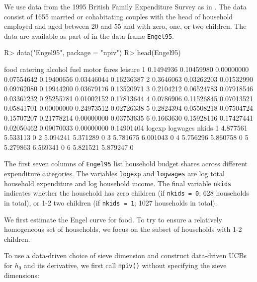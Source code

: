 \documentclass[
]{jss}
\begin{document}
We use data from the 1995 British Family Expenditure Survey as in
\citet{BCK}. The data consist of 1655 married or cohabitating couples
with the head of household employed and aged between 20 and 55 and with
zero, one, or two children. The data are available as part of 
in the data frame \texttt{Engel95}.

\begin{CodeChunk}
\begin{CodeInput}
R> data("Engel95", package = "npiv")
R> head(Engel95)
\end{CodeInput}
\begin{CodeOutput}
       food   catering    alcohol       fuel      motor      fares    leisure
1 0.1494936 0.10459980 0.00000000 0.07554642 0.19400656 0.03446044 0.16236387
2 0.3646063 0.03262203 0.01532990 0.09762080 0.19944200 0.03679176 0.13520971
3 0.2104212 0.06524783 0.07918546 0.03367232 0.25255781 0.01002152 0.17813644
4 0.0786906 0.11526845 0.07013521 0.05841701 0.00000000 0.24973512 0.02726338
5 0.2824394 0.05508218 0.07504724 0.15707207 0.21778214 0.00000000 0.03753635
6 0.1663630 0.15928116 0.17427441 0.02050462 0.09070033 0.00000000 0.14901404
    logexp logwages nkids
1 4.877561 5.533113     0
2 5.094241 5.371289     0
3 5.781675 6.001043     0
4 5.756296 5.860758     0
5 5.279863 6.569341     0
6 5.821521 5.879247     0
\end{CodeOutput}
\end{CodeChunk}

The first seven columns of \texttt{Engel95} list household budget shares
across different expenditure categories. The variables \texttt{logexp}
and \texttt{logwages} are log total household expenditure and log
household income. The final variable \texttt{nkids} indicates whether
the household has zero children (if \texttt{nkids\ =\ 0}; 628 households
in total), or 1-2 two children (if \texttt{nkids\ =\ 1}; 1027 households
in total).

We first estimate the Engel curve for food. To try to ensure a
relatively homogeneous set of households, we focus on the subset of
households with 1-2 children.

\begin{CodeChunk}
\end{CodeChunk}

To use a data-driven choice of sieve dimension and construct data-driven
UCBs for \(h_0\) and its derivative, we first call \texttt{npiv()}
without specifying the sieve dimensions:
\end{document}
